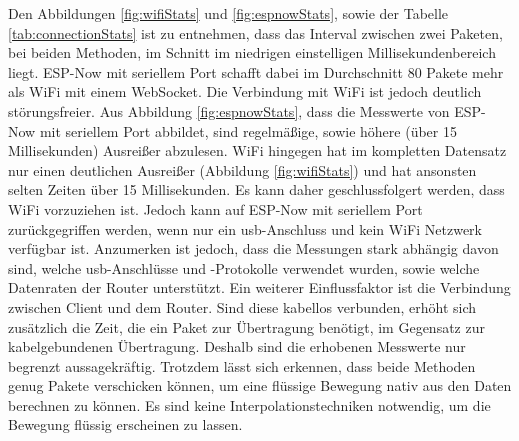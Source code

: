 Den Abbildungen \ref{fig:wifiStats} und \ref{fig:espnowStats}, sowie der Tabelle \ref{tab:connectionStats} ist zu entnehmen, dass das Interval zwischen zwei Paketen, bei beiden Methoden, im Schnitt im niedrigen einstelligen Millisekundenbereich liegt.
ESP-Now mit seriellem Port schafft dabei im Durchschnitt 80 Pakete mehr als WiFi mit einem WebSocket.
Die Verbindung mit WiFi ist jedoch deutlich störungsfreier.
Aus Abbildung \ref{fig:espnowStats}, dass die Messwerte von ESP-Now mit seriellem Port abbildet, sind regelmäßige, sowie höhere (über 15 Millisekunden) Ausreißer abzulesen.
WiFi hingegen hat im kompletten Datensatz nur einen deutlichen Ausreißer (Abbildung \ref{fig:wifiStats}) und hat ansonsten selten Zeiten über 15 Millisekunden.
Es kann daher geschlussfolgert werden, dass WiFi vorzuziehen ist.
Jedoch kann auf ESP-Now mit seriellem Port zurückgegriffen werden, wenn nur ein \ac{usb}-Anschluss und kein WiFi Netzwerk verfügbar ist.
Anzumerken ist jedoch, dass die Messungen stark abhängig davon sind, welche \ac{usb}-Anschlüsse und -Protokolle verwendet wurden, sowie welche Datenraten der Router unterstützt.
Ein weiterer Einflussfaktor ist die Verbindung zwischen Client und dem Router.
Sind diese kabellos verbunden, erhöht sich zusätzlich die Zeit, die ein Paket zur Übertragung benötigt, im Gegensatz zur kabelgebundenen Übertragung.
Deshalb sind die erhobenen Messwerte nur begrenzt aussagekräftig.
Trotzdem lässt sich erkennen, dass beide Methoden genug Pakete verschicken können, um eine flüssige Bewegung nativ aus den Daten berechnen zu können.
Es sind keine Interpolationstechniken notwendig, um die Bewegung flüssig erscheinen zu lassen.

\newpage

